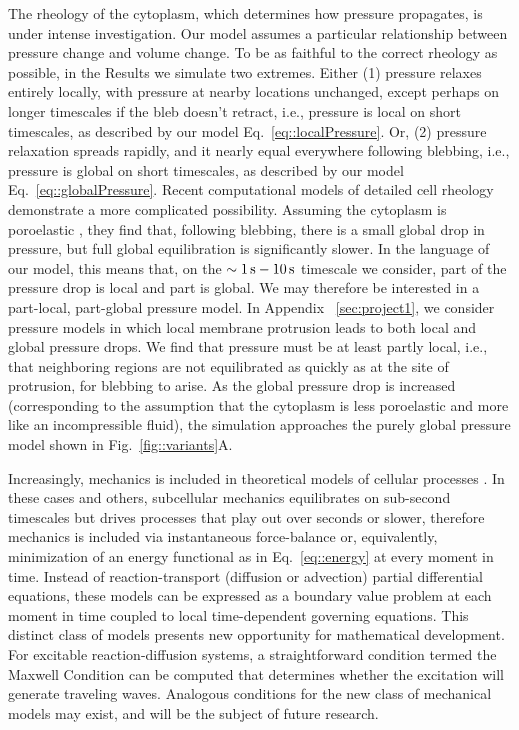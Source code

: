 
The rheology of the cytoplasm, which determines how pressure propagates, is under intense investigation. Our model assumes  a particular relationship between pressure change and volume change. To be as faithful to the correct rheology as possible, in the Results we simulate two extremes. Either (1) pressure relaxes entirely locally, with pressure at nearby locations unchanged, except perhaps on longer timescales if the bleb doesn't retract, i.e., pressure is local on short timescales, as described by our model Eq.~\ref{eq::localPressure}. Or, (2) pressure relaxation spreads rapidly, and it nearly equal everywhere following blebbing, i.e., pressure is global on short timescales, as described by our model Eq.~\ref{eq::globalPressure}. Recent computational models of detailed cell rheology \cite{Strychalski:HizQv1Ti} demonstrate a more complicated possibility. Assuming the cytoplasm is poroelastic \cite{Charras:2009dp, Moeendarbary:2013bs}, they find that, following blebbing, there is a small global drop in pressure, but full global equilibration is significantly slower. In the language of our model, this means that, on the $\sim1\,\mbox{s}-10\,\mbox{s}$ timescale we consider, part of the pressure drop is local and part is global. We may therefore be interested in a part-local, part-global pressure model. In Appendix ~\ref{sec:project1}, we consider pressure models in which local membrane protrusion leads to both local and global pressure drops. We find that pressure must be at least partly local, i.e., that neighboring regions are not equilibrated as quickly as at the site of protrusion, for blebbing to arise. As the global pressure drop is increased (corresponding to the assumption that the cytoplasm is less poroelastic and more like an incompressible fluid), the simulation approaches the purely global pressure model shown in Fig.~\ref{fig::variants}A.   


Increasingly, mechanics is included in theoretical models of cellular processes \cite{Paszek:2015it,Thon:2012dh,Peleg:2011fz,Dobrowsky:2010dr,Qi:2006ez}. In these cases and others, subcellular mechanics equilibrates on sub-second timescales but drives processes that play out over seconds or slower, therefore mechanics is included via instantaneous force-balance or, equivalently, minimization of an energy functional as in Eq.~\ref{eq::energy} at every moment in time. Instead of reaction-transport (diffusion or advection) partial differential equations, these models can be expressed as a boundary value problem at each moment in time coupled to local time-dependent governing equations. This distinct class of models presents new opportunity for mathematical development. 
For excitable reaction-diffusion systems, a straightforward condition termed the Maxwell Condition \cite{Mori:2008hj,Anonymous:OS1MPwCl,Murray:ur} can be computed that determines whether the excitation will generate traveling waves. Analogous conditions for the new class of mechanical models may exist, and will be the subject of future research. 

